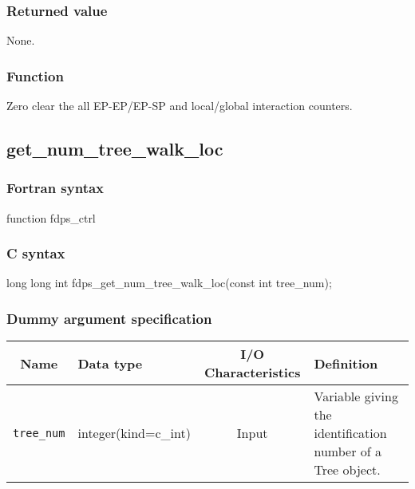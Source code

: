 \subsubsection*{Returned value}
None.

\subsubsection*{Function}
Zero clear the all EP-EP/EP-SP and local/global interaction counters.

\clearpage

\subsection{get\_num\_tree\_walk\_loc}
\subsubsection*{Fortran syntax}
\begin{screen}
\begin{spverbatim}
function fdps_ctrl%
\end{spverbatim}
\end{screen}

\subsubsection*{C syntax}
\begin{screen}
\begin{spverbatim}
long long int fdps_get_num_tree_walk_loc(const int tree_num);
\end{spverbatim}
\end{screen}

\subsubsection*{Dummy argument specification}
\begin{table}[h]
\begin{tabularx}{\linewidth}{cXcX}
\toprule
\rowcolor{Snow2}
Name & Data type & I/O Characteristics & Definition \\
\midrule
\verb|tree_num|  & integer(kind=c\_int) & Input & Variable giving the identification number of a Tree object. \\
\bottomrule
\end{tabularx}
\end{table}

